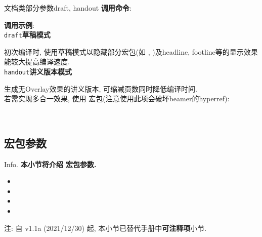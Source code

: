\begin{frame}{文档类部分参数}{draft, handout}
	\textbf{调用命令}: 

  \textbf{调用示例}: \\

  \alert{\texttt{draft}}\hfill \textbf{草稿模式}

	初次编译时, 使用草稿模式以隐藏部分宏包(如 , )及headline, footline等的显示效果能较大提高编译速度.\\

	\alert{\texttt{handout}}\hfill \textbf{讲义版本模式}

	生成无Overlay效果的讲义版本, 可缩减页数同时降低编译时间.\\
	若需实现多合一效果, 使用  宏包(注意使用此项会破坏beamer的hyperref):
	\begin{center}
		\begin{minipage}{.8\textwidth}
			\raggedright
			\\
		\end{minipage}
	\end{center}
\end{frame}

\subsection{ 宏包参数}
\begin{frame}{Info.}
	\textbf{本小节将介绍  宏包参数.}
	\begin{multicols}{2}
		\begin{itemize}
			\item {}
			\item {}
			\item {}
			\item {}
		\end{itemize}
	\end{multicols}
	注: 自 \textcolor{scugreen}{v1.1a (2021/12/30)} 起, 本小节已替代手册中\alert{\textbf{可注释项}}小节.\par
	\mycopyright
\end{frame}

